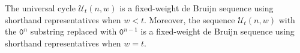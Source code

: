 \documentclass[US-letter,USenglish,authorcolumns,autoref]{lipics-v2021}
\renewcommand{\tt} {\mathtt}
\begin{document}
\begin{theorem}
The universal cycle $\mathcal{U}_t(n,w)$ is a fixed-weight de Bruijn sequence using shorthand representatives when $w < t$.  Moreover, the sequence $\mathcal{U}_t(n,w)$ with the $\tt{0}^n$ substring replaced with $\tt{0}^{n-1}$ is a fixed-weight de Bruijn sequence using shorthand representatives when $w = t$.
\end{theorem}



  





 
\end{document}
